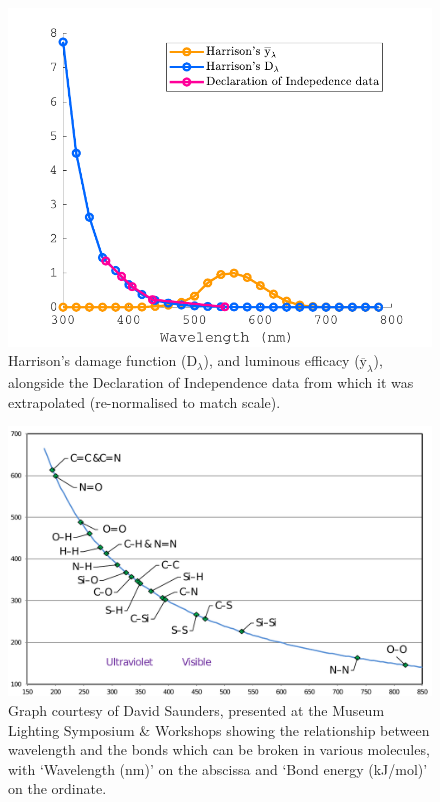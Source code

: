 \begin{figure}[htbp]
\includegraphics[max width=\textwidth]{figs/LitRev/HarrisonInd.pdf}
\caption{Harrison's \citep{harrison_report_1953} damage function ($\mathrm{D}_{\lambda}$), and luminous efficacy ($\overline{\mathrm{y}}_{\lambda}$), alongside the Declaration of Independence data \citep{noauthor_preservation_1951} from which it was extrapolated (re-normalised to match scale).}
\label{fig:Harrison}
\end{figure}

\begin{figure}[htbp]
\includegraphics[max width=\textwidth]{figs/LitRev/Saunders.pdf}
\caption{Graph courtesy of David Saunders, presented at the Museum Lighting Symposium \& Workshops \citep[p.61]{pokorska_book_2017} showing the relationship between wavelength and the bonds which can be broken in various molecules, with `Wavelength (nm)' on the abscissa and `Bond energy (kJ/mol)' on the ordinate.}
\label{fig:Saunders}
\end{figure}

